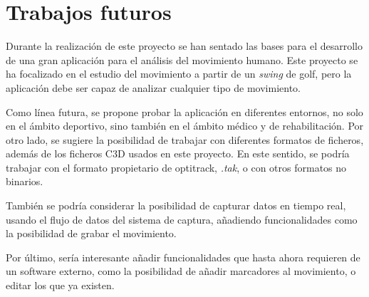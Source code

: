 \section{Trabajos futuros}

Durante la realización de este proyecto se han sentado las bases para el desarrollo de una gran aplicación para el análisis del movimiento humano. Este proyecto se ha focalizado en el estudio del movimiento a partir de un \textit{swing} de golf, pero la aplicación debe ser capaz de analizar cualquier tipo de movimiento. 

Como línea futura, se propone probar la aplicación en diferentes entornos, no solo en el ámbito deportivo, sino también en el ámbito médico y de rehabilitación. Por otro lado, se sugiere la posibilidad de trabajar con diferentes formatos de ficheros, además de los ficheros \ac{C3D} usados en este proyecto. En este sentido, se podría trabajar con el formato propietario de optitrack, \textit{.tak}, o con otros formatos no binarios.

También se podría considerar la posibilidad de capturar datos en tiempo real, usando el flujo de datos del sistema de captura, añadiendo funcionalidades como la posibilidad de grabar el movimiento.

Por último, sería interesante añadir funcionalidades que hasta ahora requieren de un software externo, como la posibilidad de añadir marcadores al movimiento, o editar los que ya existen.
